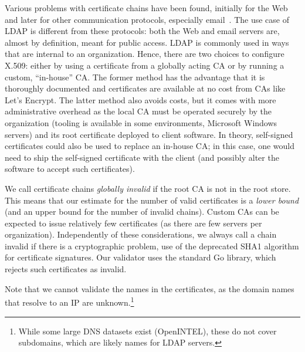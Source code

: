 Various problems with certificate chains have been found, initially for the Web~\cite{holz2011,Durumeric2013} and later for other communication protocols, especially email~\cite{holz2016}. The use case of LDAP is different from these protocols: both the Web and email servers are, almost by definition, meant for public access. LDAP is commonly used in ways that are internal to an organization. Hence, there are two choices to configure X.509: either by using a certificate from a globally acting CA or by running a custom, ``in-house'' CA. The former method has the advantage that it is thoroughly documented and certificates are available at no cost from CAs like Let's Encrypt. The latter method also avoids costs, but it comes with more administrative overhead as the local CA must be operated securely by the organization (tooling is available in some environments, \eg Microsoft Windows servers) and its root certificate deployed to client software. In theory, self-signed certificates could also be used to replace an in-house CA; in this case, one would need to ship the self-signed certificate with the client (and possibly alter the software to accept such certificates).

We call certificate chains \textit{globally invalid} if the root CA is
not in the root store. This means that our estimate for the number of valid certificates is a \textit{lower bound} (and an upper bound for the number of invalid chains). Custom CAs can be expected to issue relatively few certificates (as there are few servers per organization).
Independently of these considerations, we always call a chain invalid if there is a cryptographic problem, \eg use of the deprecated SHA1 algorithm for certificate signatures. Our validator uses the standard Go library, which rejects
such certificates as invalid.

Note that we cannot validate the names in the certificates, as the domain names that resolve to an IP are unknown.\footnote{While some large DNS datasets exist (\eg OpenINTEL), these do not cover subdomains, which are likely names for \acrshort{LDAP} servers.}

 




    